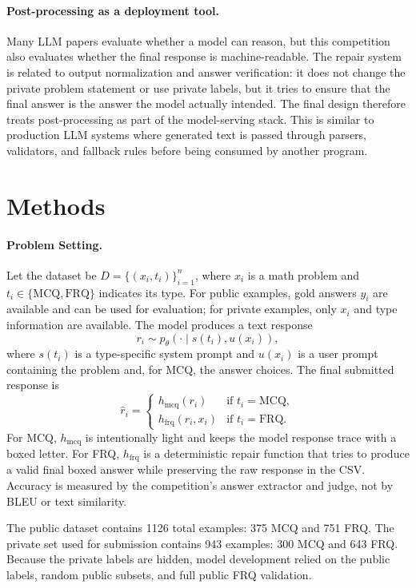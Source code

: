 \documentclass{article}
\begin{document}
\paragraph{Post-processing as a deployment tool.}
Many LLM papers evaluate whether a model can reason, but this competition also evaluates whether the final response is machine-readable. The repair system is related to output normalization and answer verification: it does not change the private problem statement or use private labels, but it tries to ensure that the final answer is the answer the model actually intended. The final design therefore treats post-processing as part of the model-serving stack. This is similar to production LLM systems where generated text is passed through parsers, validators, and fallback rules before being consumed by another program.

\section{Methods}
\label{sec:methods}

\paragraph{Problem Setting.}
Let the dataset be $D=\{(x_i, t_i)\}_{i=1}^{n}$, where $x_i$ is a math problem and $t_i \in \{\mathrm{MCQ}, \mathrm{FRQ}\}$ indicates its type. For public examples, gold answers $y_i$ are available and can be used for evaluation; for private examples, only $x_i$ and type information are available. The model produces a text response
\[
    r_i \sim p_\theta(\cdot \mid s(t_i), u(x_i)),
\]
where $s(t_i)$ is a type-specific system prompt and $u(x_i)$ is a user prompt containing the problem and, for MCQ, the answer choices. The final submitted response is
\[
    \hat{r}_i =
    \begin{cases}
    h_{\mathrm{mcq}}(r_i) & \text{if } t_i=\mathrm{MCQ},\\
    h_{\mathrm{frq}}(r_i, x_i) & \text{if } t_i=\mathrm{FRQ}.
    \end{cases}
\]
For MCQ, $h_{\mathrm{mcq}}$ is intentionally light and keeps the model response trace with a boxed letter. For FRQ, $h_{\mathrm{frq}}$ is a deterministic repair function that tries to produce a valid final boxed answer while preserving the raw response in the CSV. Accuracy is measured by the competition's answer extractor and judge, not by BLEU or text similarity.

The public dataset contains 1126 total examples: 375 MCQ and 751 FRQ. The private set used for submission contains 943 examples: 300 MCQ and 643 FRQ. Because the private labels are hidden, model development relied on the public labels, random public subsets, and full public FRQ validation.
\end{document}
